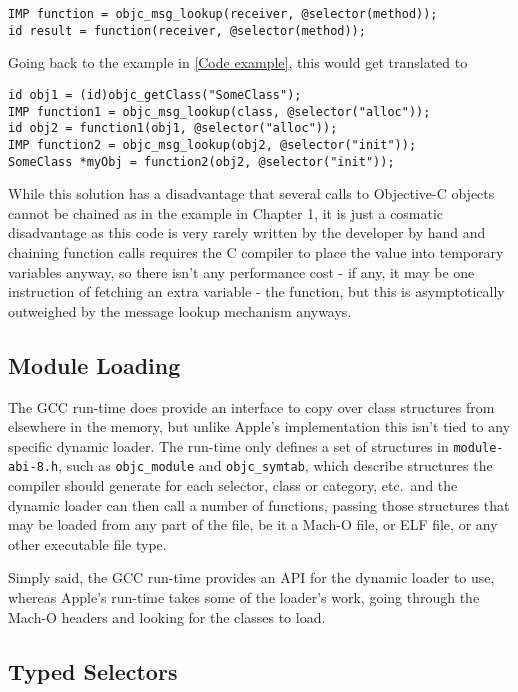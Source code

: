 \begin{verbatim}
IMP function = objc_msg_lookup(receiver, @selector(method));
id result = function(receiver, @selector(method));
\end{verbatim}

Going back to the example in \ref{Code example}, this would get translated to

\begin{verbatim}
id obj1 = (id)objc_getClass("SomeClass");
IMP function1 = objc_msg_lookup(class, @selector("alloc"));
id obj2 = function1(obj1, @selector("alloc"));
IMP function2 = objc_msg_lookup(obj2, @selector("init"));
SomeClass *myObj = function2(obj2, @selector("init"));
\end{verbatim}

While this solution has a disadvantage that several calls to Objective-C objects cannot be chained as in the example in Chapter 1, it is just a cosmatic disadvantage as this code is very rarely written by the developer by hand and chaining function calls requires the C compiler to place the value into temporary variables anyway, so there isn't any performance cost - if any, it may be one instruction of fetching an extra variable - the function, but this is asymptotically outweighed by the message lookup mechanism anyways.

\subsection{Module Loading}

The GCC run-time does provide an interface to copy over class structures from elsewhere in the memory, but unlike Apple's implementation this isn't tied to any specific dynamic loader. The run-time only defines a set of structures in \verb=module-abi-8.h=, such as \verb=objc_module= and \verb=objc_symtab=, which describe structures the compiler should generate for each selector, class or category, etc.\ and the dynamic loader can then call a number of functions, passing those structures that may be loaded from any part of the file, be it a Mach-O file, or ELF file, or any other executable file type.

Simply said, the GCC run-time provides an API for the dynamic loader to use, whereas Apple's run-time takes some of the loader's work, going through the Mach-O headers and looking for the classes to load.

\subsection{Typed Selectors}


